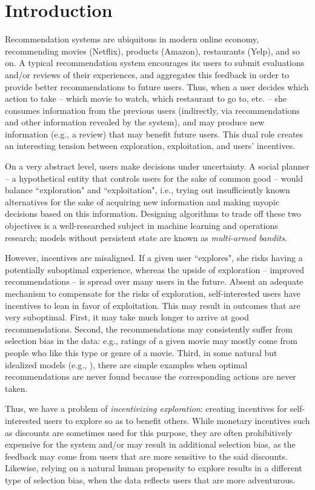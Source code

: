 \section{Introduction}

Recommendation systems are ubiquitous in modern online economy, recommending movies (Netflix), products (Amazon), restaurants (Yelp), and so on. A typical recommendation system encourages its users to submit evaluations and/or reviews of their experiences, and aggregates this feedback in order to provide better recommendations to future users. Thus, when a user decides which action to take -- which movie to watch, which restaurant to go to, etc. -- she  consumes information from the previous users (indirectly, via recommendations and other information revealed by the system), and may produce new information (e.g., a review) that may benefit future users. This dual role creates an interesting tension between exploration, exploitation, and users' incentives.

On a very abstract level, users make decisions under uncertainty. A social planner -- a hypothetical entity that controls users for the sake of common good -- would balance ``exploration" and ``exploitation", i.e., trying out insufficiently known alternatives for the sake of acquiring new information and making myopic decisions based on this information. Designing algorithms to trade off these two objectives is a well-researched subject in machine learning and operations research; models without persistent state are known as \emph{multi-armed bandits}.

However, incentives are misaligned. If a given user ``explores", she risks having a potentially suboptimal experience, whereas the upside of exploration -- improved recommendations -- is spread over many users in the future. Absent an adequate mechanism to compensate for the risks of exploration, self-interested users have incentives to lean in favor of exploitation. This may result in outcomes that are very suboptimal. First, it may take much longer to arrive at good recommendations. Second, the recommendations may consistently suffer from selection bias in the data: e.g., ratings of a given movie may mostly come from people who like this type or genre of a movie. Third, in some natural but idealized models (e.g., \cite{Kremer-JPE14,ICexploration-ec15}), there are simple  examples when optimal recommendations are never found because the corresponding actions are never taken.

Thus, we have a problem of \emph{incentivizing exploration}: creating incentives for self-interested users to explore so as to benefit others. While monetary incentives such as discounts are sometimes used for this purpose, they are often prohibitively expensive for the system and/or may result in additional selection bias, as the feedback may come from users that are more sensitive to the said discounts. Likewise, relying on a natural human propensity to explore results in a different type of selection bias, when the data reflects users that are more adventurous. 

